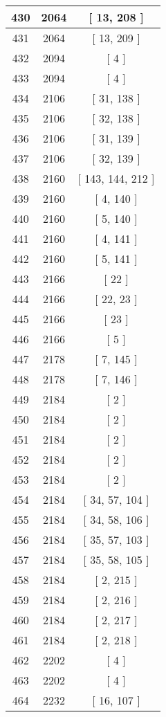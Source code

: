 \begin{center}
\begin{longtable}[H]{|| c c c ||}
\hline
430 & 2064 & [ 13, 208 ] \\ 
\hline
431 & 2064 & [ 13, 209 ] \\ 
\hline
432 & 2094 & [ 4 ] \\ 
\hline
433 & 2094 & [ 4 ] \\ 
\hline
434 & 2106 & [ 31, 138 ] \\ 
\hline
435 & 2106 & [ 32, 138 ] \\ 
\hline
436 & 2106 & [ 31, 139 ] \\ 
\hline
437 & 2106 & [ 32, 139 ] \\ 
\hline
438 & 2160 & [ 143, 144, 212 ] \\ 
\hline
439 & 2160 & [ 4, 140 ] \\ 
\hline
440 & 2160 & [ 5, 140 ] \\ 
\hline
441 & 2160 & [ 4, 141 ] \\ 
\hline
442 & 2160 & [ 5, 141 ] \\ 
\hline
443 & 2166 & [ 22 ] \\ 
\hline
444 & 2166 & [ 22, 23 ] \\ 
\hline
445 & 2166 & [ 23 ] \\ 
\hline
446 & 2166 & [ 5 ] \\ 
\hline
447 & 2178 & [ 7, 145 ] \\ 
\hline
448 & 2178 & [ 7, 146 ] \\ 
\hline
449 & 2184 & [ 2 ] \\ 
\hline
450 & 2184 & [ 2 ] \\ 
\hline
451 & 2184 & [ 2 ] \\ 
\hline
452 & 2184 & [ 2 ] \\ 
\hline
453 & 2184 & [ 2 ] \\ 
\hline
454 & 2184 & [ 34, 57, 104 ] \\ 
\hline
455 & 2184 & [ 34, 58, 106 ] \\ 
\hline
456 & 2184 & [ 35, 57, 103 ] \\ 
\hline
457 & 2184 & [ 35, 58, 105 ] \\ 
\hline
458 & 2184 & [ 2, 215 ] \\ 
\hline
459 & 2184 & [ 2, 216 ] \\ 
\hline
460 & 2184 & [ 2, 217 ] \\ 
\hline
461 & 2184 & [ 2, 218 ] \\ 
\hline
462 & 2202 & [ 4 ] \\ 
\hline
463 & 2202 & [ 4 ] \\ 
\hline
464 & 2232 & [ 16, 107 ] \\ 

\end{longtable}
\end{center}
